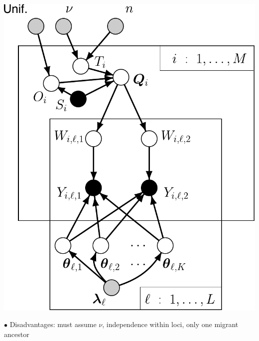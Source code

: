 \begin{minipage}{.475\textwidth}
\vfill
\hfill\includegraphics*[width=.95\textwidth]{illus/PritchPriorPopDuo.pdf}
\vfill
\end{minipage}

\noindent$\bullet$ Disadvantages:  must assume  $\nu$, independence
within loci, only one migrant ancestor





